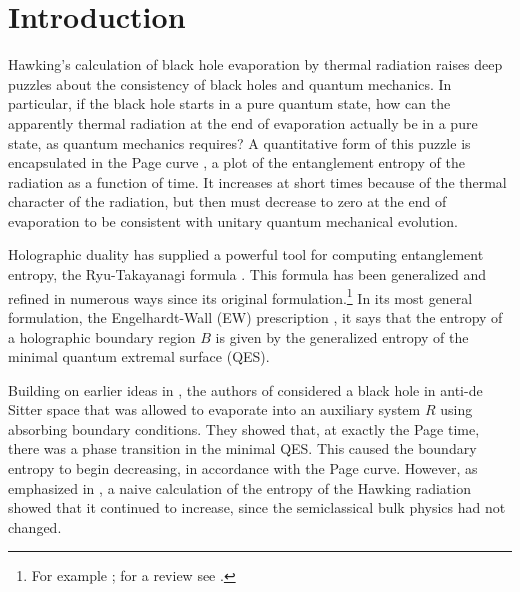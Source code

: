 \documentclass[12pt]{article}
\numberwithin{equation}{section}
\begin{document}
\section{Introduction}
Hawking's calculation \cite{hawking1975} of black hole evaporation by thermal radiation raises deep puzzles about the consistency of black holes and quantum mechanics.   In particular, if the black hole starts in a pure quantum state, how can the apparently thermal radiation at the end of evaporation actually be in a pure state, as quantum mechanics requires?  A quantitative form of this puzzle is encapsulated in the Page curve \cite{Page:1993df}, a plot of the entanglement entropy of the radiation as a function of time.   It increases at short times because of the thermal character of the radiation, but then must decrease to zero at the end of evaporation to be consistent with unitary quantum mechanical evolution.

Holographic duality has supplied a powerful tool for computing entanglement entropy, the Ryu-Takayanagi formula \cite{Ryu:2006bv}.  This formula has been generalized and refined in numerous ways since its original formulation.\footnote{For example \cite{Headrick:2007km,Hubeny:2007xt,Wall:2012uf,Lewkowycz:2013nqa,Faulkner:2013ana,Dong:2016hjy}; for a review see \cite{Rangamani:2016dms}.} In its most general formulation, the Engelhardt-Wall (EW) prescription \cite{Engelhardt:2014gca}, it says that the entropy of a holographic boundary region $B$ is given by the generalized entropy of the minimal quantum extremal surface (QES).

Building on earlier ideas in \cite{Almheiri:2018xdw, Hayden:2018khn}, the authors of \cite{Penington:2019npb, Almheiri:2019psf} considered a black hole in anti-de Sitter space that was allowed to evaporate into an auxiliary system $R$ using absorbing boundary conditions.  They showed that, at exactly the Page time, there was a phase transition in the minimal QES. This caused the boundary entropy to begin decreasing, in accordance with the Page curve. However, as emphasized in \cite{Almheiri:2019psf}, a naive calculation of the entropy of the Hawking radiation showed that it continued to increase, since the semiclassical bulk physics had not changed. 
\end{document}
